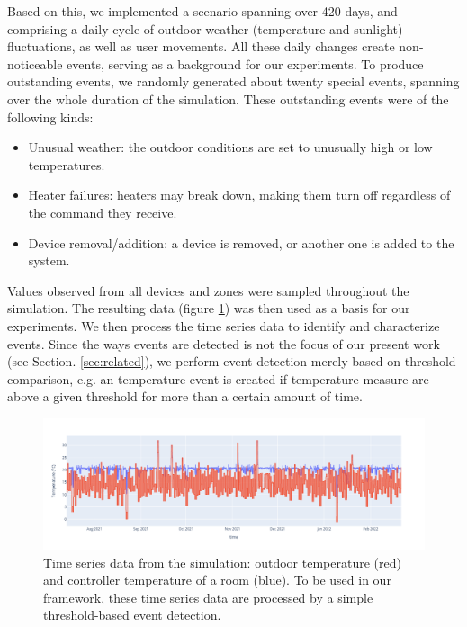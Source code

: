 \documentclass[entropy,article,submit,moreauthors,pdftex]{Definitions/mdpi}
\begin{document}
Based on this, we implemented a scenario spanning over 420 days, and
comprising a daily cycle of outdoor weather (temperature and sunlight) fluctuations, as well
as user movements. All these daily changes create non-noticeable events,
serving as a background for our experiments. To produce outstanding
events, we randomly generated about twenty special events, spanning over the whole
duration of the simulation. These outstanding events were of the following kinds:

\begin{itemize}
    \item Unusual weather: the outdoor conditions are set to unusually high or
          low temperatures.
    \item Heater failures: heaters may break down, making them turn off regardless
          of the command they receive.
    \item Device removal/addition: a device is removed, or another one is added
          to the system.
\end{itemize}


Values observed from all devices and zones were sampled throughout
the simulation. The resulting data (figure
\ref{fig:ts_example}) was then used as a basis for our experiments.
We then process the time series data to identify and characterize events.
Since the ways events are detected is not the focus of our present work (see Section.
\ref{sec:related}), we perform event detection merely based on threshold comparison, e.g. an temperature event is created if temperature measure are above a given threshold for more than a certain amount of time.

\begin{figure}[!ht]
    \includegraphics[width=\linewidth]{figures/ts_example}
    \caption{Time series data from the simulation: outdoor temperature (red) and
        controller temperature of a room (blue). To be used in our framework, these time series data are
        processed by a simple threshold-based event detection.}
    \label{fig:ts_example}
\end{figure}
\end{document}
